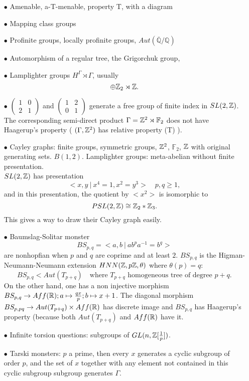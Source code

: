 \begin{itemize}
\item[$\bullet$] Amenable, a-T-menable, property T, with a diagram
\item[$\bullet$] Mapping class groups 
\item[$\bullet$] Profinite groups, locally profinite groups, $Aut(\overline{\mathbb Q} /\mathbb Q)$
\item[$\bullet$] Automorphism of a regular tree, the Grigorchuk group,
\item[$\bullet$] Lamplighter groups $ H^\Gamma\rtimes \Gamma$, usually 
\[\oplus \mathbb Z_2 \rtimes \mathbb Z.\]
\item[$\bullet$] $\begin{pmatrix}1 & 0 \\ 2 & 1\end{pmatrix}$ and $\begin{pmatrix}1 & 2 \\ 0 & 1\end{pmatrix}$ generate a free group of finite index in $SL(2,\mathbb Z)$. The corresponding semi-direct product $\Gamma = \mathbb Z^2\rtimes \mathbb F_2$ does not have Haagerup's property ( $(\Gamma, \mathbb Z^2)$ has relative property (T) ).\\

\item[$\bullet$] Cayley graphs: finite groups, symmetric groups, $\mathbb Z^2$, $\mathbb F_2$, $\mathbb Z$ with original generating sets. $B(1,2)$. Lamplighter groups: meta-abelian without finite presentation. \\

$SL(2,\mathbb Z)$ has presentation 
\[<x,y \ | \ x^4=1, x^2=y^3> \quad p,q \geq 1,\] 
and in this presentation, the quotient by $<x^2>$ is isomorphic to \[PSL(2,\mathbb Z)\cong \mathbb Z_2 \ast \mathbb Z_3.\] This gives a way to draw their Cayley graph easily.\\

\item[$\bullet$] Baumslag-Solitar monster
\[BS_{p,q} = <a,b \ | \ ab^p a^{-1} = b^q>\]
are nonhopfian when $p$ and $q$ are coprime and at least $2$. $BS_{p,q}$ is the Higman-Neumann-Neumann extension $HNN(\mathbb Z,p \mathbb Z, \theta)$ where $\theta(p)=q$: 
\[BS_{p,q} < Aut(T_{p+q}) \quad \text{where } T_{p+q}\text{ homogeneous tree of degree }p+q.\]
On the other hand, one has a non injective morphism $BS_{p,q}\rightarrow Aff(\mathbb R); a \mapsto \frac{qx}{p} ; b\mapsto x+1$. The diagonal morphism $BS_{p,pq} \rightarrow Aut(T_{p+q})\times Aff(\mathbb R)$ has discrete image and $BS_{p,q}$ has Haagerup's property (because both $Aut(T_{p+q})$ and $Aff(\mathbb R)$ have it.\\

\item[$\bullet$] Infinite torsion questions: subgroups of $GL(n, \mathbb Z[\frac{1}{p}])$.\\
\item[$\bullet$] Tarski monsters: $p$ a prime, then every $x$ generates a cyclic subgroup of order $p$, and the set of $x$ together with any element not contained in this cyclic subgroup subgroup generates $\Gamma$. 
\end{itemize}

